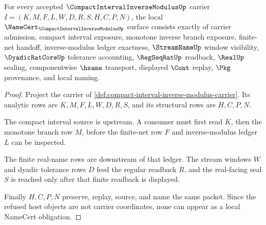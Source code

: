 \begin{theorem}
\label{thm:compact-interval-inverse-modulus-namecert-obligations}
For every accepted $\CompactIntervalInverseModulusUp$ carrier $I=(K,M,F,L,W,D,R,S,H,C,P,N)$, the local $\NameCert_{\CompactIntervalInverseModulusUp}$ surface consists exactly of carrier admission, compact interval exposure, monotone inverse branch exposure, finite-net handoff, inverse-modulus ledger exactness, $\StreamNameUp$ window visibility, $\DyadicRatCoreUp$ tolerance accounting, $\RegSeqRatUp$ readback, $\RealUp$ sealing, componentwise $\hsame$ transport, displayed $\Cont$ replay, $\Pkg$ provenance, and local naming.
\end{theorem}
\begin{proof}
Project the carrier of \autoref{def:compact-interval-inverse-modulus-carrier}. Its analytic rows are $K,M,F,L,W,D,R,S$, and its structural rows are $H,C,P,N$.

The compact interval source is upstream. A consumer must first read $K$, then the monotone branch row $M$, before the finite-net row $F$ and inverse-modulus ledger $L$ can be inspected.

The finite real-name rows are downstream of that ledger. The stream windows $W$ and dyadic tolerance rows $D$ feed the regular readback $R$, and the real-facing seal $S$ is reached only after that finite readback is displayed.

Finally $H,C,P,N$ preserve, replay, source, and name the same packet. Since the refused host objects are not carrier coordinates, none can appear as a local NameCert obligation.
\end{proof}

